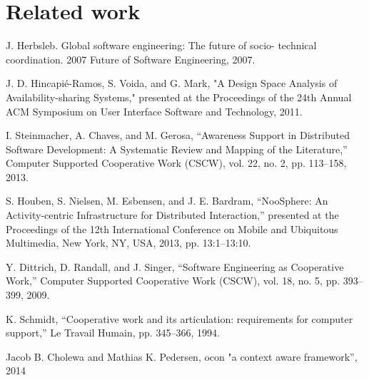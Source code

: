 \documentclass{sigchi}
\begin{document}
\section{Related work}

J. Herbsleb. Global software engineering: The future of socio- technical coordination. 2007 Future of Software Engineering, 2007.

J. D. Hincapié-Ramos, S. Voida, and G. Mark, "A Design Space Analysis of Availability-sharing Systems," presented at the Proceedings of the 24th Annual ACM Symposium on User Interface Software and Technology, 2011.

I. Steinmacher, A. Chaves, and M. Gerosa, “Awareness Support in Distributed Software Development: A Systematic Review and Mapping of the Literature,” Computer Supported Cooperative Work (CSCW), vol. 22, no. 2, pp. 113–158, 2013.

S. Houben, S. Nielsen, M. Esbensen, and J. E. Bardram, “NooSphere: An Activity-centric Infrastructure for Distributed Interaction,” presented at the Proceedings of the 12th International Conference on Mobile and Ubiquitous Multimedia, New York, NY, USA, 2013, pp. 13:1–13:10.

Y. Dittrich, D. Randall, and J. Singer, “Software Engineering as Cooperative Work,” Computer Supported Cooperative Work (CSCW), vol. 18, no. 5, pp. 393–399, 2009.

K. Schmidt, “Cooperative work and its articulation: requirements for computer support,” Le Travail Humain, pp. 345–366, 1994.

Jacob B. Cholewa and Mathias K. Pedersen, ocon "a context aware framework”, 2014


%
%

\end{document}
